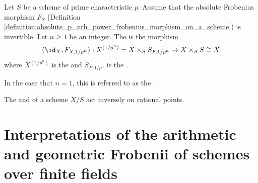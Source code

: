 \begin{definition} \label{definition:geometric_frobenius_of_a_scheme_over_a_scheme_of_prime_characteristic_with_invertible_absolute_frobenius}
    Let $S$ be a scheme of prime characteristic $p$. Assume that the absolute Frobenius morphism $F_{S}$ (Definition \ref{definition:absolute_p_nth_power_frobenius_morphism_on_a_scheme}) is invertible. Let $n \geq 1$ be an integer.
    The  is the morphism
    $$(\id_X, F_{X,1/p^n}):  X^{(1/p^n)} = X \times_S S_{F,1/p^n} \to X \times_S S \cong X$$
    where $X^{(1/p^n)}$ is the  and $S_{F,1/p^n}$ is the .

    In the case that $n = 1$, this is referred to as the .
\end{definition}

\begin{remark}
The  and  of a scheme $X/S$ act inversely on rational points.
\end{remark}

\section{Interpretations of the arithmetic and geometric Frobenii of schemes over finite fields}

